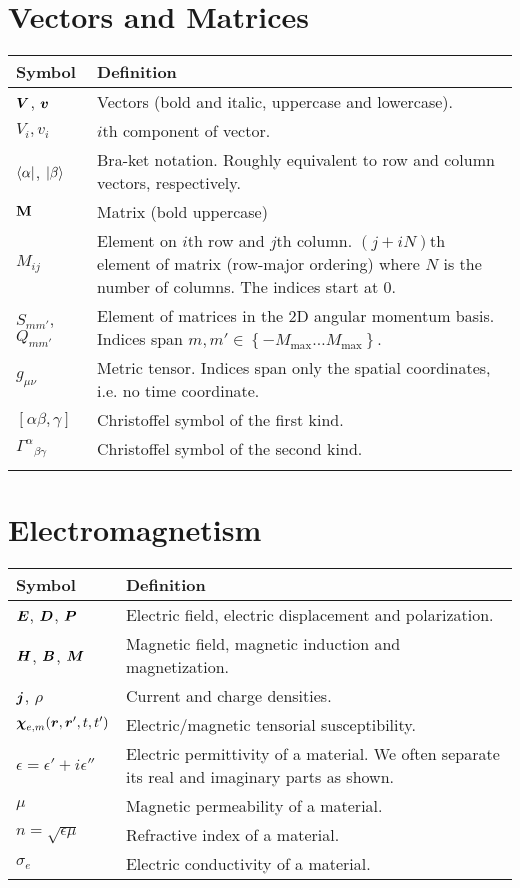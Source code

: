 \section*{Vectors and Matrices}
\begin{tabularx}{\textwidth}{lX}
  \hline\hline
  Symbol				& Definition	\\
  \hline\hline				
  $\boldsymbol{V}$, $\boldsymbol{v}$	& Vectors (bold and italic, uppercase and lowercase).	\\
  $V_i, v_i$			& $i$th component of vector.	\\
  $\Bra{\alpha}$, $\Ket{\beta}$ 
  						& Bra-ket notation. Roughly equivalent to row and column vectors, respectively.	\\ 
  $\mathbf{M}$				& Matrix (bold uppercase)	\\
  $M_{ij}$				& Element on $i$th row and $j$th column. $(j+iN)$th element of matrix (row-major ordering) 
			 				where $N$ is the number of columns. The indices start at 0.\\
  $S_{mm'}$, $Q_{mm'}$	& Element of matrices in the 2D angular momentum basis. Indices span $m,m'\in\left\{-M_\text{max}\ldots M_\text{max}\right\}$.	\\
  $g_{\mu\nu}$			& Metric tensor. Indices span only the spatial coordinates, i.e. no time coordinate. \\
  $[\alpha\beta,\gamma]$& Christoffel symbol of the first kind.	\\
  ${\Gamma^{\alpha}}_{\beta\gamma}$
						& Christoffel symbol of the second kind. \\
  \hline\hline				\\
\end{tabularx}

\section*{Electromagnetism}
\begin{tabularx}{\textwidth}{lX}
 \hline\hline
 Symbol								& Definition 	\\
 \hline\hline
 $\boldsymbol{E}$, $\boldsymbol{D}$, $\boldsymbol{P}$		& Electric field, electric displacement and polarization.	\\
 $\boldsymbol{H}$, $\boldsymbol{B}$, $\boldsymbol{M}$		& Magnetic field, magnetic induction and magnetization.	\\
 $\boldsymbol{j}$, $\rho$					& Current and charge densities.	\\
 $\boldsymbol{\chi}_{e,m}(\boldsymbol{r},\boldsymbol{r}',t,t')$	& Electric/magnetic tensorial susceptibility. 	\\
 $\epsilon=\epsilon'+i\epsilon''$	& Electric permittivity of a material. We often separate its real and imaginary parts as shown.	\\
 $\mu$								& Magnetic permeability of a material. \\
 $n=\sqrt{\epsilon\mu}$				& Refractive index of a material. 	\\
 $\sigma_e$							& Electric conductivity of a material. \\
 \hline\hline
\end{tabularx}


